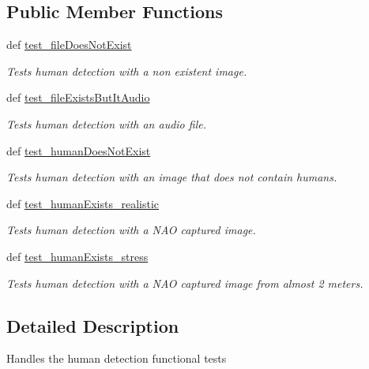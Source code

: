 \subsection*{Public Member Functions}
\begin{DoxyCompactItemize}
\item 
def \hyperlink{classfunctional__tests_1_1HumanDetFunc_aaa6e3a1a731f9585fab34d035c05b874}{test\-\_\-file\-Does\-Not\-Exist}
\begin{DoxyCompactList}\small\item\em Tests human detection with a non existent image. \end{DoxyCompactList}\item 
def \hyperlink{classfunctional__tests_1_1HumanDetFunc_a4fc900b3b0fdb6e604f9b8bdaae5296d}{test\-\_\-file\-Exists\-But\-It\-Audio}
\begin{DoxyCompactList}\small\item\em Tests human detection with an audio file. \end{DoxyCompactList}\item 
def \hyperlink{classfunctional__tests_1_1HumanDetFunc_a8074f58695d994f010ad333fed75068b}{test\-\_\-human\-Does\-Not\-Exist}
\begin{DoxyCompactList}\small\item\em Tests human detection with an image that does not contain humans. \end{DoxyCompactList}\item 
def \hyperlink{classfunctional__tests_1_1HumanDetFunc_a2736713be5cc1ddd091331d3306dfd0e}{test\-\_\-human\-Exists\-\_\-realistic}
\begin{DoxyCompactList}\small\item\em Tests human detection with a N\-A\-O captured image. \end{DoxyCompactList}\item 
def \hyperlink{classfunctional__tests_1_1HumanDetFunc_a6d8971bce2f04f8ea05f6d30e22b6d2c}{test\-\_\-human\-Exists\-\_\-stress}
\begin{DoxyCompactList}\small\item\em Tests human detection with a N\-A\-O captured image from almost 2 meters. \end{DoxyCompactList}\end{DoxyCompactItemize}


\subsection{Detailed Description}
\begin{DoxyVerb}Handles the human detection functional tests
\end{DoxyVerb}
 

